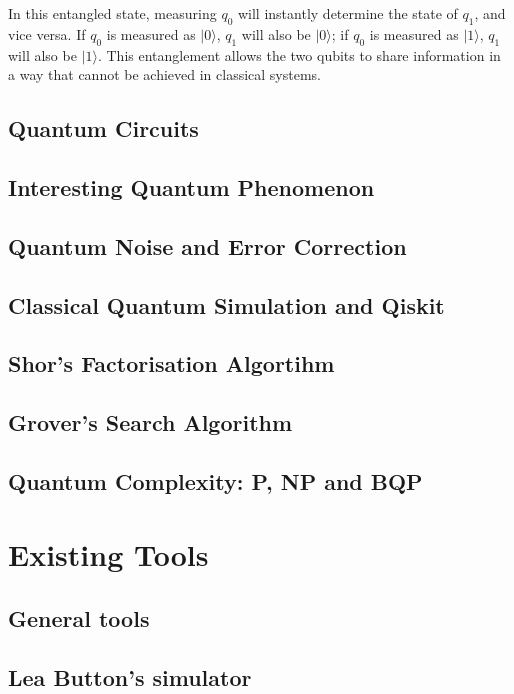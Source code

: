 In this entangled state, measuring \( q_0 \) will instantly determine the state of \( q_1 \), and vice versa. If \( q_0 \) is measured as \( |0\rangle \), \( q_1 \) will also be \( |0\rangle \); if \( q_0 \) is measured as \( |1\rangle \), \( q_1 \) will also be \( |1\rangle \). This entanglement allows the two qubits to share information in a way that cannot be achieved in classical systems.


\subsection{Quantum Circuits}
\subsection{Interesting Quantum Phenomenon}

\subsection{Quantum Noise and Error Correction }

\subsection{Classical Quantum Simulation and Qiskit}


\subsection{Shor's Factorisation Algortihm }

\subsection{Grover's Search Algorithm }

\subsection{Quantum Complexity: P, NP and BQP}

\newpage

\section{Existing Tools}

\subsection{General tools}
\subsection{Lea Button's simulator}

